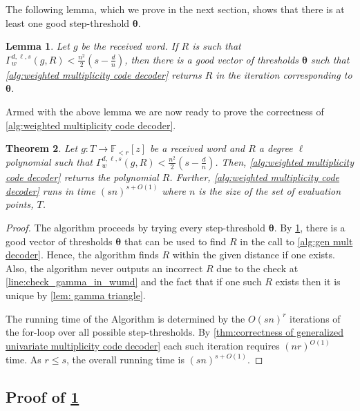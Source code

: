 \documentclass{article}
\newtheorem{theorem}{Theorem}\newtheorem{lemma}[theorem]{Lemma}\newtheorem{proposition}[theorem]{Proposition}\newtheorem{corollary}[theorem]{Corollary}\newtheorem{definition}[theorem]{Definition}\newtheorem{claim}[theorem]{Claim}\newtheorem{remark}[theorem]{Remark}\newtheorem{observation}[theorem]{Observation}
\def\Field{\mathbb{F}}
\let\F\Field
\newcommand{\thetabar}{{\boldsymbol{\theta}}}
\begin{document}
	The following lemma, which we prove in the next section, shows that there is at least one good step-threshold $\thetabar$.
	
	\begin{lemma} \label{LEM:THRESHOLD_EXISTS}
		Let $g$ be the received word. If $R$ is such that $\Gamma_w^{d, \ell, s}(g, R) < \frac{n^2}{2}(s-\frac{d}{n})$, then there is a good vector of thresholds $\thetabar$ such that \cref{alg:weighted multiplicity code decoder} returns $R$ in the iteration corresponding to $\thetabar$.
	\end{lemma}
	
	Armed with the above lemma we are now ready to prove the correctness of \cref{alg:weighted multiplicity code decoder}.
	
	\begin{theorem} \label{thm: correctness of wumd}
		Let $g\colon T \to \F_{<r}[z]$ be a received word and $R$ a degree $\ell$ polynomial such that $\Gamma_w^{d, \ell, s}(g, R) < \frac{n^2}{2}(s-\frac{d}{n})$. Then, \cref{alg:weighted multiplicity code decoder} returns the polynomial $R$. Further, \cref{alg:weighted multiplicity code decoder} runs in time $(sn)^{s + O(1)}$ where $n$ is the size of the set of evaluation points, $T$. 
	\end{theorem}
	
	\begin{proof}
		The algorithm proceeds by trying every step-threshold $\thetabar$. By \cref{LEM:THRESHOLD_EXISTS}, there is a good vector of thresholds $\thetabar$ that can be used to find $R$ in the call to \cref{alg:gen mult decoder}. Hence, the algorithm finds $R$ within the given distance if one exists. Also, the algorithm never outputs an incorrect $R$ due to the check at \cref{line:check_gamma_in_wumd} and the fact that if one such $R$ exists then it is unique by \cref{lem: gamma triangle}.
		
		The running time of the Algorithm is determined by the $O(sn)^r$ iterations of the for-loop over all possible step-thresholds. By \cref{thm:correctness of generalized univariate multiplicity code decoder}  each such iteration requires $(nr)^{O(1)}$ time. As $r\leq s$, the overall running time is $(sn)^{s+O(1)}$.
	\end{proof}
	
	\subsection{Proof of \texorpdfstring{\cref{LEM:THRESHOLD_EXISTS}}{Lemma 6.5}}
	
\end{document}
